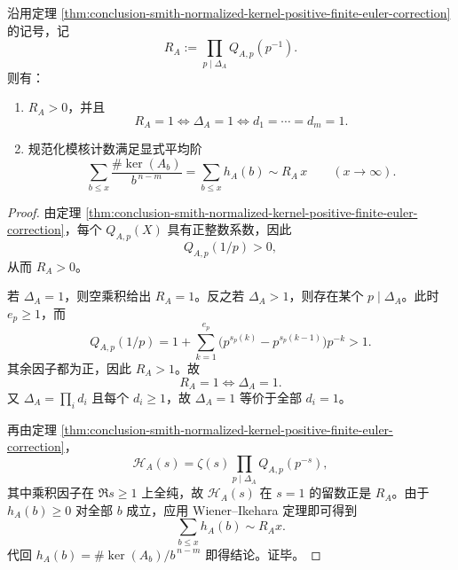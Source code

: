 \begin{corollary}\label{cor:conclusion-smith-normalized-kernel-average-order}
沿用定理 \ref{thm:conclusion-smith-normalized-kernel-positive-finite-euler-correction} 的记号，记
\[
R_A:=\prod_{p\mid\Delta_A}Q_{A,p}(p^{-1}).
\]
则有：
\begin{enumerate}
  \item \(R_A>0\)，并且
  \[
  R_A=1
  \iff
  \Delta_A=1
  \iff
  d_1=\cdots=d_m=1.
  \]
  \item 规范化模核计数满足显式平均阶
  \[
  \sum_{b\le x}\frac{\#\ker(A_b)}{b^{\,n-m}}
  =
  \sum_{b\le x}h_A(b)
  \sim
  R_A\,x
  \qquad (x\to\infty).
  \]
\end{enumerate}
\end{corollary}
\begin{proof}
由定理 \ref{thm:conclusion-smith-normalized-kernel-positive-finite-euler-correction}，每个 \(Q_{A,p}(X)\) 具有正整数系数，因此
\[
Q_{A,p}(1/p)>0,
\]
从而 \(R_A>0\)。

若 \(\Delta_A=1\)，则空乘积给出 \(R_A=1\)。反之若 \(\Delta_A>1\)，则存在某个 \(p\mid\Delta_A\)。此时 \(e_p\ge 1\)，而
\[
Q_{A,p}(1/p)
=
1+\sum_{k=1}^{e_p}\bigl(p^{s_p(k)}-p^{s_p(k-1)}\bigr)p^{-k}
>1.
\]
其余因子都为正，因此 \(R_A>1\)。故
\[
R_A=1\iff \Delta_A=1.
\]
又 \(\Delta_A=\prod_i d_i\) 且每个 \(d_i\ge 1\)，故 \(\Delta_A=1\) 等价于全部 \(d_i=1\)。

再由定理 \ref{thm:conclusion-smith-normalized-kernel-positive-finite-euler-correction}，
\[
\mathcal H_A(s)=\zeta(s)\prod_{p\mid\Delta_A}Q_{A,p}(p^{-s}),
\]
其中乘积因子在 \(\Re s\ge 1\) 上全纯，故 \(\mathcal H_A(s)\) 在 \(s=1\) 的留数正是 \(R_A\)。由于 \(h_A(b)\ge 0\) 对全部 \(b\) 成立，应用 Wiener--Ikehara 定理即可得到
\[
\sum_{b\le x}h_A(b)\sim R_Ax.
\]
代回 \(h_A(b)=\#\ker(A_b)/b^{\,n-m}\) 即得结论。证毕。
\end{proof}

